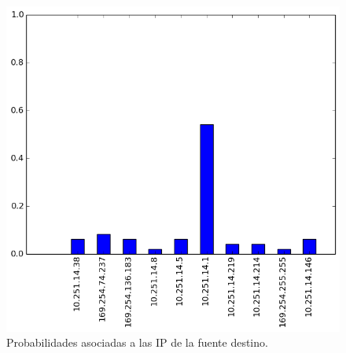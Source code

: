 \begin{figure}[h!]
  \centering
	\includegraphics[scale=0.66]{../experimentacion-svilerino/starbucks/full-experiment-1/histogram_dst_probabilities.png}
  \caption{Probabilidades asociadas a las IP de la fuente destino.}
  \label{fig:probabilidad-dst-starbucks}
\end{figure}

